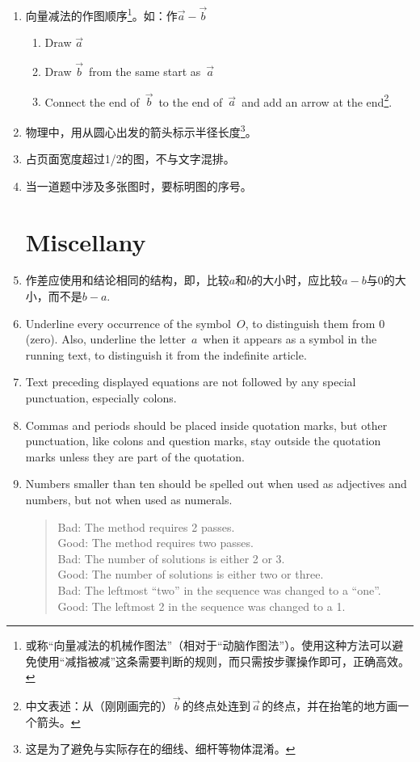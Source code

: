 \documentclass[11pt, a4paper, titlepage]{article}
\begin{document}
\begin{enumerate}
\item 向量减法的作图顺序\footnote{或称“向量减法的机械作图法”（相对于“动脑作图法”）。使用这种方法可以避免使用“减指被减”这条需要判断的规则，而只需按步骤操作即可，正确高效。}。如：作$\vec{a} - \vec{b}$
    \begin{enumerate}[label=(\roman*)]
        \item Draw $\vec{a}$
        \item Draw $\vec{b}\,$ from the same start as $\,\vec{a}$
        \item Connect the end of $\,\vec{b}\,$ to the end of $\,\vec{a}\,$ and add an arrow at the end\footnote{中文表述：从（刚刚画完的）$\vec{b}\,$的终点处连到$\,\vec{a}\,$的终点，并在抬笔的地方画一个箭头。}.
    \end{enumerate}

\item 物理中，用从圆心出发的箭头标示半径长度\footnote{这是为了避免与实际存在的细线、细杆等物体混淆。}。

\item 占页面宽度超过1/2的图，不与文字混排。

\item 当一道题中涉及多张图时，要标明图的序号。




\part{Miscellany}
\item 作差应使用和结论相同的结构，即，比较$a$和$b$的大小时，应比较$a-b$与$0$的大小，而不是$b-a$.

\item Underline every occurrence of the symbol $\,O$, to distinguish them from 0 (zero). Also, underline the letter $\,a\,$ when it appears as a symbol in the running text, to distinguish it from the indefinite article.

\item Text preceding displayed equations are not followed by any special punctuation, especially colons.

\item Commas and periods should be placed inside quotation marks, but other punctuation, like colons and question marks, stay outside the quotation marks unless they are part of the quotation.

\item Numbers smaller than ten should be spelled out when used as adjectives and numbers, but not when used as numerals.
    \begin{quote}
    Bad: The method requires 2 passes.\\
    Good: The method requires two passes.\\
    Bad: The number of solutions is either 2 or 3.\\
    Good: The number of solutions is either two or three.\\
    Bad: The leftmost ``two'' in the sequence was changed to a ``one''.\\
    Good: The leftmost 2 in the sequence was changed to a 1.
    \end{quote}


\end{enumerate}
\end{document}
